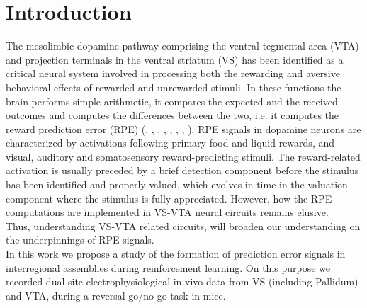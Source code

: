 \chapter{Introduction}
\label{chap:Introduction}
The mesolimbic dopamine pathway comprising the ventral tegmental area (VTA) and projection terminals in the ventral striatum (VS) has been identified as a critical neural system involved in processing both the rewarding and aversive behavioral effects of rewarded and unrewarded stimuli. In these functions the brain performs simple arithmetic, it compares the expected and the received outcomes and computes the differences between the two, i.e. it computes the reward prediction error (RPE) (\cite{Schultz2001}, \cite{Schultz2002}, \cite{Fiorillo}, \cite{Eshel1}, \cite{Pagnoni}, \cite{Radua}, \cite{Takahashi2016}, \cite{TianHuang}). RPE signals in dopamine neurons are characterized by activations following primary food and liquid rewards, and visual, auditory and somatosensory reward-predicting stimuli. The reward-related activation is usually preceded by a brief detection component before the stimulus has been identified and properly valued, which evolves in time in the valuation component where the stimulus is fully appreciated. However, how the RPE computations are implemented in VS-VTA neural circuits remains elusive.\\
Thus, understanding VS-VTA related circuits, will broaden our understanding on the underpinnings of RPE signals.\\In this work we propose a study of the formation of prediction error signals in interregional assemblies during reinforcement learning. On this purpose we recorded dual site electrophysiological in-vivo data from VS (including Pallidum) and VTA, during a reversal go/no go task in mice.\\%
